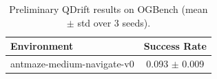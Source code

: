 \begin{table}[h]
\centering
\small
\begin{tabular}{l c}
\toprule
\textbf{Environment} & \textbf{Success Rate} \\
\midrule
antmaze-medium-navigate-v0 & 0.093 $\pm$ 0.009 \\
\bottomrule
\end{tabular}
\caption{Preliminary QDrift results on OGBench (mean $\pm$ std over 3 seeds).}
\label{tab:preliminary_results}
\end{table}